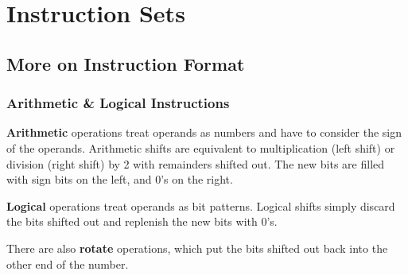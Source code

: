 \section{Instruction Sets}

\subsection{More on Instruction Format}

\subsubsection{Arithmetic \& Logical Instructions}

\textbf{Arithmetic} operations treat operands as numbers and have to consider the sign
of the operands. Arithmetic shifts are equivalent to multiplication (left shift) or
division (right shift) by 2 with remainders shifted out. The new bits are filled with
sign bits on the left, and 0's on the right.

\textbf{Logical} operations treat operands as bit patterns. Logical shifts simply discard
the bits shifted out and replenish the new bits with 0's.

There are also \textbf{rotate} operations, which put the bits shifted out back into the
other end of the number.